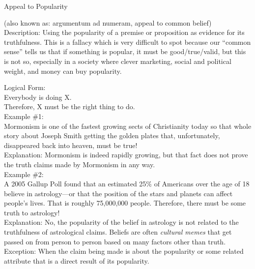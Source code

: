 \documentclass[a4paper,12pt,single,pdftex]{scrbook}
\begin{document}
  

Appeal to Popularity
    
      (also known as: argumentum ad numeram, appeal to common belief)
    \\

  
    Description: Using the popularity of a premise or proposition as evidence for its truthfulness.  This is a fallacy which is very difficult to spot because our “common sense” tells us that if something is popular, it must be good/true/valid, but this is not so, especially in a society where clever marketing, social and political weight, and money can buy popularity.

    
      Logical Form:
    \\

    
      Everybody is doing X.
    \\

    
      Therefore, X must be the right thing to do.
    \\

    
      Example \#1: 
    \\

    
      Mormonism is one of the fastest growing sects of Christianity today so that whole story about Joseph Smith getting the golden plates that, unfortunately, disappeared back into heaven, must be true!
    \\

    
      Explanation: Mormonism is indeed rapidly growing, but that fact does not prove the truth claims made by Mormonism in any way.
    \\

    
      Example \#2: 
    \\

    
      A 2005 Gallup Poll found that an estimated 25\% of Americans over the age of 18 believe in astrology—or that the position of the stars and planets can affect people's lives.  That is roughly 75,000,000 people.  Therefore, there must be some truth to astrology!
    \\

    
      Explanation: No, the popularity of the belief in astrology is not related to the truthfulness of astrological claims.  Beliefs are often {\it cultural memes} that get passed on from person to person based on many factors other than truth. 
    \\

    
      Exception: When the claim being made is about the popularity or some related attribute that is a direct result of its popularity.
    \\
\end{document}
